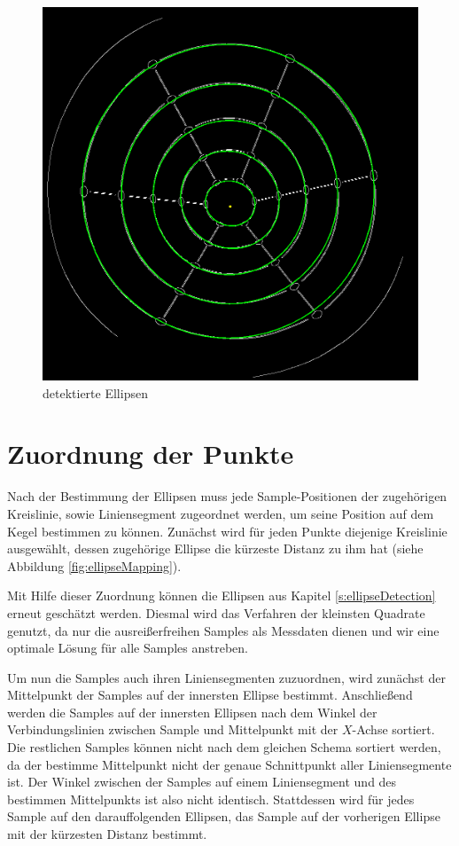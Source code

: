 \begin{figure}[!htb]
	\centering
	\includegraphics[scale=.25]{images/detectedEllipses.png}
	\caption{detektierte Ellipsen}
	\label{fig:detectedEllipses}
\end{figure}

\newpage
\section{Zuordnung der Punkte}
\label{s:pointMapping}
Nach der Bestimmung der Ellipsen muss jede Sample-Positionen der zugehörigen Kreislinie, sowie Liniensegment zugeordnet werden, um seine Position auf dem Kegel bestimmen zu können. 
Zunächst wird für jeden Punkte diejenige Kreislinie ausgewählt, dessen zugehörige Ellipse die kürzeste Distanz zu ihm hat (siehe Abbildung \ref{fig:ellipseMapping}).

Mit Hilfe dieser Zuordnung können die Ellipsen aus Kapitel \ref{s:ellipseDetection} erneut geschätzt werden. Diesmal wird das Verfahren der kleinsten Quadrate genutzt, da nur die ausreißerfreihen Samples als Messdaten dienen und wir eine optimale Lösung für alle Samples anstreben.  

Um nun die Samples auch ihren Liniensegmenten zuzuordnen, wird zunächst der Mittelpunkt der Samples auf der innersten Ellipse bestimmt. Anschließend werden die Samples auf der innersten Ellipsen nach dem Winkel der Verbindungslinien zwischen Sample und Mittelpunkt mit der $X$-Achse sortiert. 
Die restlichen Samples können nicht nach dem gleichen Schema sortiert werden, da der bestimme Mittelpunkt nicht der genaue Schnittpunkt aller Liniensegmente ist. Der Winkel zwischen der Samples auf einem Liniensegment und des bestimmen Mittelpunkts ist also nicht identisch. 
Stattdessen wird für jedes Sample  auf den darauffolgenden Ellipsen, das Sample auf der vorherigen Ellipse mit der kürzesten Distanz bestimmt. 

